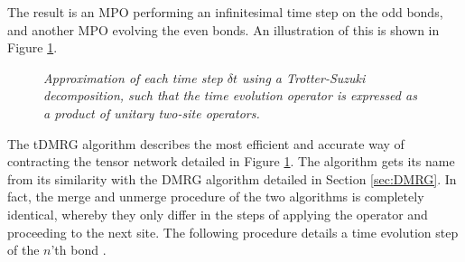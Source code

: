 The result is an MPO performing an infinitesimal time step on the odd bonds, and another MPO evolving the even bonds. An illustration of this is shown in Figure \ref{fig:oddevenops}.
\begin{figure}[h!]
	\centering
	
	\caption{\textit{Approximation of each time step $\delta t$ using a Trotter-Suzuki decomposition, such that the time evolution operator is expressed as a product of unitary two-site operators.}}
	\label{fig:oddevenops}
\end{figure}
The tDMRG algorithm describes the most efficient and accurate way of contracting the tensor network detailed in Figure \ref{fig:oddevenops}. The algorithm gets its name from its similarity with the DMRG algorithm detailed in Section \ref{sec:DMRG}. In fact, the merge and unmerge procedure of the two algorithms is completely identical, whereby they only differ in the steps of applying the operator and proceeding to the next site. The following procedure details a time evolution step of the $n$'th bond \cite{schollwock}.


